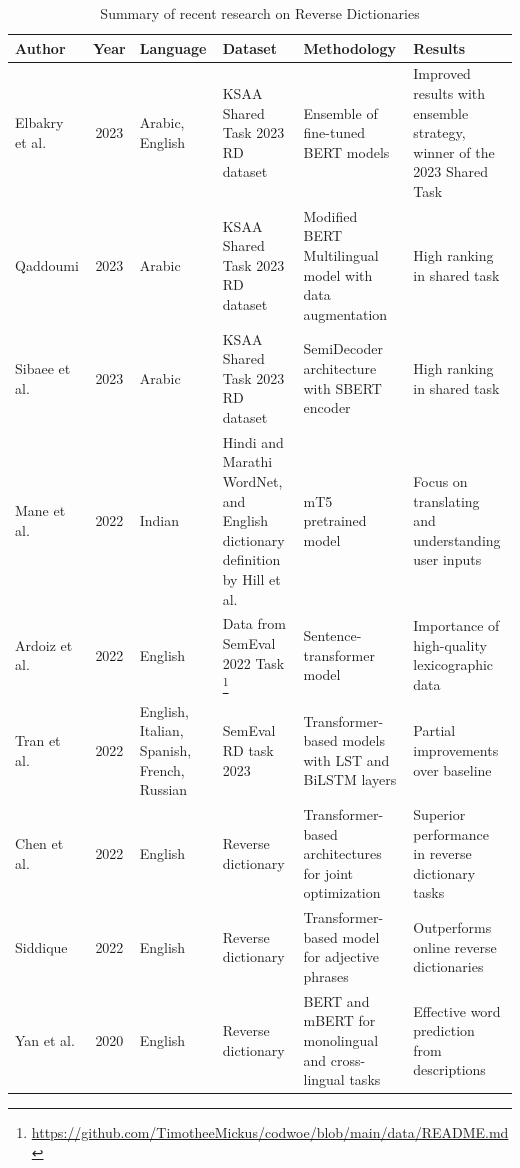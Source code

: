 \documentclass[15pt]{article}
\begin{document}
\begin{table}
    \centering
    \caption{Summary of recent research on Reverse Dictionaries}
     \renewcommand{\arraystretch}{1.5}
    \begin{tabularx}{\textwidth}{|l|c|X|X|X|X|}
        \hline
        \textbf{Author} & \textbf{Year} &  \textbf{Language} & \textbf{Dataset} & \textbf{Methodology} & \textbf{Results} \\
        \hline
        Elbakry et al. \cite{Albakry2023} & 2023 & Arabic, English & KSAA Shared Task 2023 RD dataset & Ensemble of fine-tuned BERT models & Improved results with ensemble strategy, winner of the 2023 Shared Task \\
        \hline
        Qaddoumi \cite{Qaddoumi2023} & 2023 & Arabic & KSAA Shared Task 2023 RD dataset & Modified BERT Multilingual model with data augmentation & High ranking in shared task \\
        \hline
        Sibaee et al. \cite{Sibaee2023} & 2023 & Arabic & KSAA Shared Task 2023 RD dataset & SemiDecoder architecture with SBERT encoder & High ranking in shared task \\
        \hline
        Mane et al. \cite{Mane2022} & 2022 & Indian & Hindi and Marathi WordNet, and English dictionary deﬁnition by Hill et al. \cite{Hill2016} & mT5 pretrained model & Focus on translating and understanding user inputs \\
        \hline
        Ardoiz et al. \cite{Ardoiz2022} & 2022 & English & Data from SemEval 2022 Task \footnote{\href{https://github.com/TimotheeMickus/codwoe/blob/main/data/README.md}{https://github.com/TimotheeMickus/codwoe/blob/main/data/README.md}} & Sentence-transformer model & Importance of high-quality lexicographic data \\
        \hline
        Tran et al.\cite{Tran2022} & 2022 & English, Italian, Spanish, French, Russian & SemEval RD task 2023 & Transformer-based models with LST and BiLSTM layers & Partial improvements over baseline \\
        \hline
        Chen et al. \cite{Chen2022} & 2022 & English & Reverse dictionary & Transformer-based architectures for joint optimization & Superior performance in reverse dictionary tasks \\
        \hline
        Siddique \cite{Siddique2022} & 2022 & English & Reverse dictionary & Transformer-based model for adjective phrases & Outperforms online reverse dictionaries \\
        \hline
        Yan et al. \cite{Yan2020} & 2020 & English & Reverse dictionary & BERT and mBERT for monolingual and cross-lingual tasks & Effective word prediction from descriptions \\

\end{tabularx}
\end{table}
\end{document}
